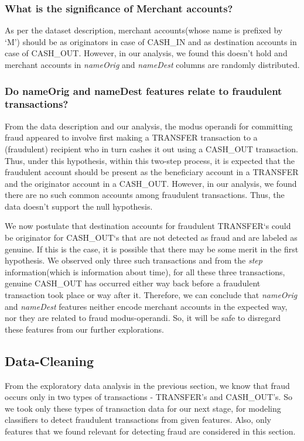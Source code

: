 \documentclass[letterpaper, 12 pt, conference]{ieeeconf}  %
\begin{document}
\subsubsection{What is the significance of Merchant accounts?}
As per the dataset description, merchant accounts(whose name is prefixed by `M') should be as originators in case of CASH\_IN and as destination accounts in case of CASH\_OUT. However, in our analysis, we found this doesn't hold and merchant accounts in \textit{nameOrig} and \textit{nameDest} columns are randomly distributed.

\subsubsection{Do nameOrig and nameDest features relate to fraudulent transactions?}
From the data description and our analysis, the modus operandi for committing fraud appeared to involve first making a TRANSFER transaction to a (fraudulent) recipient who in turn cashes it out using a CASH\_OUT transaction. Thus, under this hypothesis, within this two-step process, it is expected that the fraudulent account should be present as the beneficiary account in a TRANSFER and the originator account in a CASH\_OUT. However, in our analysis, we found there are no such common accounts among fraudulent transactions. Thus, the data doesn't support the null hypothesis.

We now postulate that destination accounts for fraudulent TRANSFER`s could be originator for CASH\_OUT`s that are not detected as fraud and are labeled as genuine. If this is the case, it is possible that there may be some merit in the first hypothesis. We observed only three such transactions and from the \textit{step} information(which is information about time), for all these three transactions, genuine CASH\_OUT has occurred either way back before a fraudulent transaction took place or way after it. Therefore, we can conclude that \textit{nameOrig} and \textit{nameDest} features neither encode merchant accounts in the expected way, nor they are related to fraud modus-operandi. So, it will be safe to disregard these features from our further explorations.


\subsection{Data-Cleaning}
From the exploratory data analysis in the previous section, we know that fraud occurs only in two types of transactions - TRANSFER's and CASH\_OUT's. So we took only these types of transaction data for our next stage, for modeling classifiers to detect fraudulent transactions from given features. Also, only features that we found relevant for detecting fraud are considered in this section.
\end{document}
